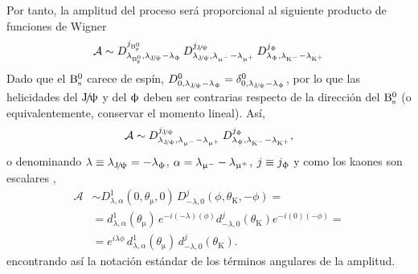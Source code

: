 %
Por tanto, la amplitud del proceso será proporcional al siguiente producto de funciones de Wigner
\[\mathcal{A} \sim D_{\lambda_{\mathrm{B}{}_{\mathrm{s}}^{0}},\lambda_{\mathrm{J}\!/\!\uppsi}-\lambda_{\upphi}}^{j_{\mathrm{B}{}_{\mathrm{s}}^{0}}}\,D_{\lambda_{\mathrm{J}\!/\!\uppsi},\lambda_{\upmu{}^{-}}-\lambda_{\upmu{}^{+}}}^{j_{\mathrm{J}\!/\!\uppsi}}\, D_{\lambda_{\upphi},\lambda_{\mathrm{K}{}^{-}}-\lambda_{\mathrm{K}{}^{+}}}^{j_{\upphi}}\]
Dado que el $\mathrm{B}{}_{\mathrm{s}}^{0}$ carece de espín, $D_{0,\lambda_{\mathrm{J}\!/\!\uppsi}-\lambda_{\upphi}}^0 = \delta_{0,\lambda_{\mathrm{J}\!/\!\uppsi}-\lambda_{\upphi}}^0$, por lo que las helicidades del $\mathrm{J}\!/\!\uppsi$ y del $\upphi$ deben ser contrarias respecto de la dirección del $\mathrm{B}{}_{\mathrm{s}}^{0}$ (o equivalentemente, conservar el momento lineal). Así,
\[\mathcal{A} \sim D_{\lambda_{\mathrm{J}\!/\!\uppsi},\lambda_{\upmu{}^{-}}-\lambda_{\upmu{}^{+}}}^{j_{\mathrm{J}\!/\!\uppsi}}\, D_{\lambda_{\upphi},\lambda_{\mathrm{K}{}^{-}}-\lambda_{\mathrm{K}{}^{+}}}^{j_{\upphi}},\]
o denominando $\lambda \equiv \lambda_{\mathrm{J}\!/\!\uppsi} = - \lambda_{\upphi} $, $\alpha = \lambda_{\upmu{}^{-}}-\lambda_{\upmu{}^{+}}$, $j \equiv j_{\upphi}$ y como los kaones son escalares \cite{zhang2013time},
\begin{equation}
\begin{split}
\mathcal{A} &  \sim D_{\lambda,\alpha}^{1}(0, \theta_{\upmu}, 0)\, D_{-\lambda,0}^{j} (\phi, \theta_{\text{K}} , -\phi ) = \\
&= d_{\lambda,\alpha}^{1} (\theta_{\upmu})\, e^{-i (-\lambda) (\phi)} d_{-\lambda,0}^{j}(\theta_{\text{K}}) e^{-i (0) (-\phi)} = \\ 
&= e^{i\lambda \phi} \,d_{\lambda,\alpha}^{1} (\theta_{\upmu})\,  d_{-\lambda,0}^{j}(\theta_{\text{K}}) .
\end{split}	
\end{equation}
encontrando así la notación estándar de los términos angulares de la amplitud.



